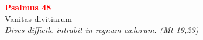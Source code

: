 


\def\greinitialformat#1{%
{\fontsize{39}{39}\selectfont #1}%
}




\vspace{0.3cm}
\begin{center}
 \textcolor{red}{\large \bf Psalmus 48}\\
Vanitas divitiarum\\
\textit{\small Dives difficile intrabit in regnum cælorum. (Mt 19,23)}
\end{center}
